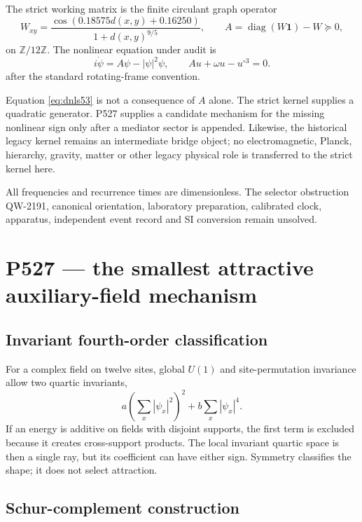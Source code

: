 \documentclass[11pt,a4paper]{article}
\begin{document}
The strict working matrix is the finite circulant graph operator
\[
 W_{xy}=\frac{\cos(0.18575d(x,y)+0.16250)}{1+d(x,y)^{9/5}},
 \qquad A=\operatorname{diag}(W\mathbf1)-W\succeq0,
\]
on $\mathbb Z/12\mathbb Z$. The nonlinear equation under audit is
\begin{equation}
 i\dot\psi=A\psi-|\psi|^2\psi,
 \qquad Au+\omega u-u^{\circ3}=0.                 \label{eq:dnls53}
\end{equation}
after the standard rotating-frame convention.

Equation \eqref{eq:dnls53} is not a consequence of $A$ alone. The strict kernel supplies a quadratic generator. P527 supplies a candidate mechanism for the missing nonlinear sign only after a mediator sector is appended. Likewise, the historical legacy kernel remains an intermediate bridge object; no electromagnetic, Planck, hierarchy, gravity, matter or other legacy physical role is transferred to the strict kernel here.

All frequencies and recurrence times are dimensionless. The selector obstruction QW-2191, canonical orientation, laboratory preparation, calibrated clock, apparatus, independent event record and SI conversion remain unsolved.

\section{P527 --- the smallest attractive auxiliary-field mechanism}

\subsection{Invariant fourth-order classification}

For a complex field on twelve sites, global $U(1)$ and site-permutation invariance allow two quartic invariants,
\[
 a\left(\sum_x|\psi_x|^2\right)^2+b\sum_x|\psi_x|^4.
\]
If an energy is additive on fields with disjoint supports, the first term is excluded because it creates cross-support products. The local invariant quartic space is then a single ray, but its coefficient can have either sign. Symmetry classifies the shape; it does not select attraction.

\subsection{Schur-complement construction}
\end{document}
